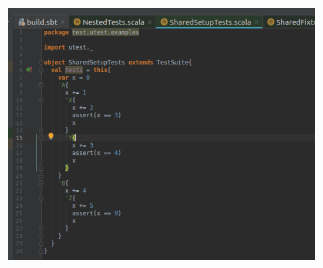 \documentclass[12pt]{article}
\begin{document}
\begin{figure}[H]
	\begin{Center}
		\includegraphics[width=3.2in,height=2.63in]{./media/image9.png}
	\end{Center}
\end{figure}



\par
\end{document}
